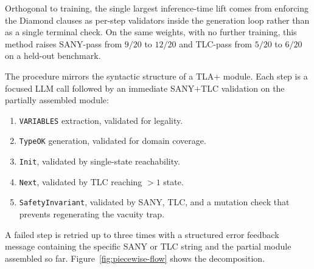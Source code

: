 \documentclass[11pt]{article}
\begin{document}
Orthogonal to training, the single largest inference-time lift
comes from enforcing the Diamond clauses as per-step
validators inside the generation loop rather than as a single
terminal check. On the same weights, with no further training,
this method raises SANY-pass from $9/20$ to $12/20$ and TLC-pass
from $5/20$ to $6/20$ on a held-out benchmark.

The procedure mirrors the syntactic structure of a TLA+ module.
Each step is a focused LLM call followed by an immediate
SANY$+$TLC validation on the partially assembled module:
\begin{enumerate}[leftmargin=1.4em, itemsep=2pt]
\item \texttt{VARIABLES} extraction, validated for legality.
\item \texttt{TypeOK} generation, validated for domain coverage.
\item \texttt{Init}, validated by single-state reachability.
\item \texttt{Next}, validated by TLC reaching $>1$ state.
\item \texttt{SafetyInvariant}, validated by SANY, TLC, and a
  mutation check that prevents regenerating the vacuity trap.
\end{enumerate}

\noindent A failed step is retried up to three times with a structured
error feedback message containing the specific SANY or TLC string and
the partial module assembled so far.
Figure~\ref{fig:piecewise-flow} shows the decomposition.
\end{document}
